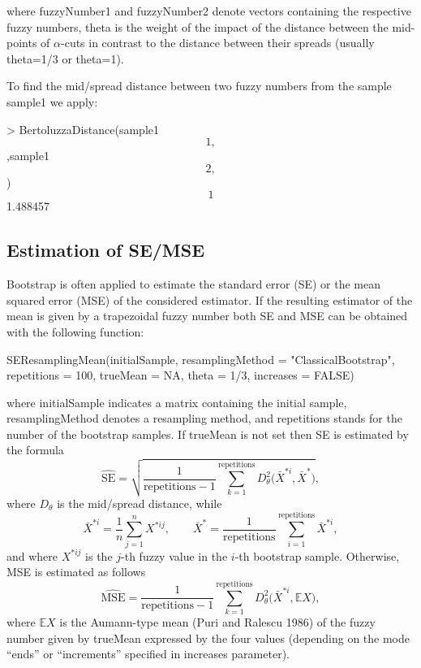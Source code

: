 where fuzzyNumber1 and fuzzyNumber2 denote vectors containing the
respective fuzzy numbers, theta is the weight of the impact of the
distance between the mid-points of \(\alpha\)-cuts in contrast to the
distance between their spreads (usually theta=1/3 or theta=1).

To find the mid/spread distance between two fuzzy numbers from the
sample sample1 we apply:

\begin{example}
\textgreater{} BertoluzzaDistance(sample1\[1,\],sample1\[2,\]) \[1\] 1.488457
\end{example}

\hypertarget{estimation-of-semse}{%
\subsection{Estimation of SE/MSE}\label{estimation-of-semse}}

Bootstrap is often applied to estimate the standard error (SE) or the
mean squared error (MSE) of the considered estimator. If the resulting
estimator of the mean is given by a trapezoidal fuzzy number both SE and
MSE can be obtained with the following function:

\begin{example}
SEResamplingMean(initialSample, resamplingMethod =
"ClassicalBootstrap", repetitions = 100, trueMean = NA, theta = 1/3,
increases = FALSE)
\end{example}

where initialSample indicates a matrix containing the initial sample,
resamplingMethod denotes a resampling method, and repetitions stands for
the number of the bootstrap samples. If trueMean is not set then SE is
estimated by the formula \[\label{frachetse}
    \widehat{\mathrm{SE}}=\sqrt{\frac{1}{\text{repetitions}-1} \sum_{k=1}^{\text{repetitions}} D^2_{\theta} \Big( \bar{X}^{*i}, \bar{X}^{*}\Big)} ,\]
where \(D_{\theta}\) is the mid/spread distance, while
\[\bar{X}^{*i} = \frac{1}{n} \sum_{j=1}^{n} X^{*ij}, \qquad \bar{X}^{*} = \frac{1}{\text{repetitions}} \sum_{i=1}^{\text{repetitions}} \bar{X}^{*i},\]
and where \(X^{*ij}\) is the \(j\)-th fuzzy value in the \(i\)-th bootstrap
sample. Otherwise, MSE is estimated as follows \[\label{frachetmse}
    \widehat{\mathrm{MSE}}=\frac{1}{\text{repetitions}-1} \sum_{k=1}^{\text{repetitions}} D^2_{\theta} \Big( \bar{X}^{*i}, \mathbb{E}X\Big) ,\]
where \(\mathbb{E}X\) is the Aumann-type mean (Puri and Ralescu 1986) of the fuzzy
number given by trueMean expressed by the four values (depending on the
mode ``ends'' or ``increments'' specified in increases parameter).

